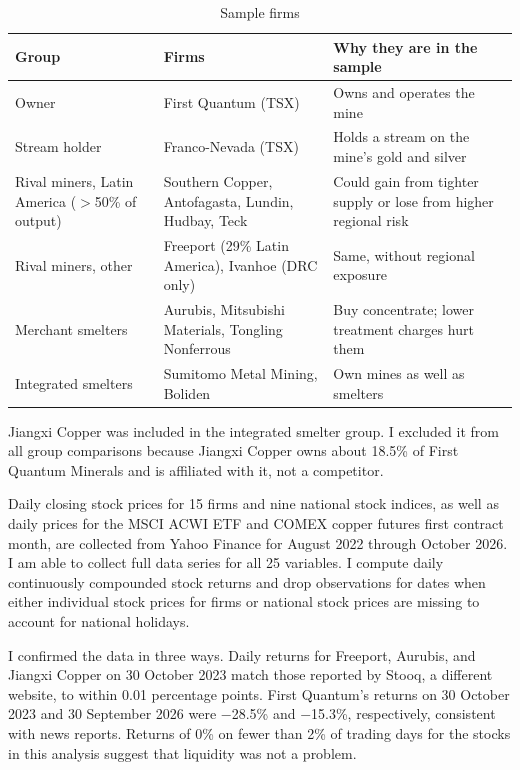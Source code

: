 \documentclass[11pt]{article}
\begin{document}
\begin{table}[h]
\centering
\caption{Sample firms}
\label{tab:sample}
\small
\begin{tabularx}{\textwidth}{l L L}
\toprule
Group & Firms & Why they are in the sample \\
\midrule
Owner & First Quantum (TSX) & Owns and operates the mine \\
Stream holder & Franco-Nevada (TSX) & Holds a stream on the mine's gold and silver \\
Rival miners, Latin America ($>$50\% of output) & Southern Copper, Antofagasta, Lundin, Hudbay, Teck & Could gain from tighter supply or lose from higher regional risk \\
Rival miners, other & Freeport (29\% Latin America), Ivanhoe (DRC only) & Same, without regional exposure \\
Merchant smelters & Aurubis, Mitsubishi Materials, Tongling Nonferrous & Buy concentrate; lower treatment charges hurt them \\
Integrated smelters & Sumitomo Metal Mining, Boliden & Own mines as well as smelters \\
\bottomrule
\end{tabularx}
\end{table}

Jiangxi Copper was included in the integrated smelter group. I excluded it from all group comparisons because Jiangxi Copper owns about 18.5\% of First Quantum Minerals and is affiliated with it, not a competitor.

Daily closing stock prices for 15 firms and nine national stock indices, as well as daily prices for the MSCI ACWI ETF and COMEX copper futures first contract month, are collected from Yahoo Finance for August 2022 through October 2026. I am able to collect full data series for all 25 variables. I compute daily continuously compounded stock returns and drop observations for dates when either individual stock prices for firms or national stock prices are missing to account for national holidays.

I confirmed the data in three ways. Daily returns for Freeport, Aurubis, and Jiangxi Copper on 30 October 2023 match those reported by Stooq, a different website, to within 0.01 percentage points. First Quantum's returns on 30 October 2023 and 30 September 2026 were $-$28.5\% and $-$15.3\%, respectively, consistent with news reports. Returns of 0\% on fewer than 2\% of trading days for the stocks in this analysis suggest that liquidity was not a problem.
\end{document}
